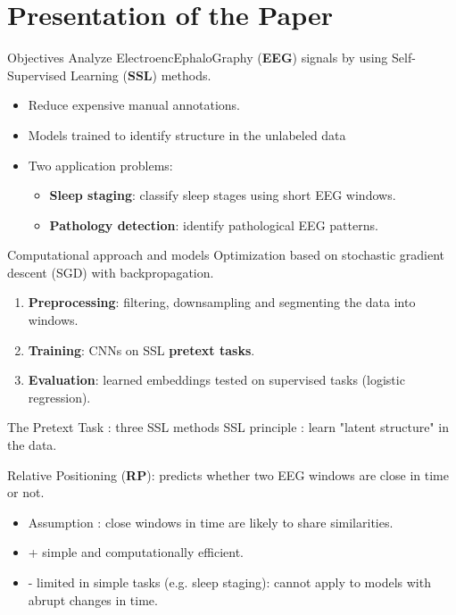 \section{Presentation of the Paper}

\begin{frame}{Objectives}
Analyze ElectroencEphaloGraphy (\textbf{EEG}) signals by using Self-Supervised Learning (\textbf{SSL}) methods.
\begin{itemize}
    \item Reduce expensive manual annotations.
    \item Models trained to identify structure in the unlabeled data
    \item Two application problems:
    \begin{itemize}
        \item \textbf{Sleep staging}: classify sleep stages using short EEG windows.
        \item \textbf{Pathology detection}: identify pathological EEG patterns.
    \end{itemize}
    \end{itemize}
\end{frame}

\begin{frame}{Computational approach and models}
Optimization based on stochastic gradient descent (SGD) with backpropagation.
    \begin{enumerate}
        \item \textbf{Preprocessing}: filtering, downsampling and segmenting the data into windows.
        \item \textbf{Training}: CNNs on SSL \textbf{pretext tasks}.
        \item \textbf{Evaluation}: learned embeddings tested on supervised tasks (logistic regression).
    \end{enumerate}
\end{frame}

\begin{frame}{The Pretext Task : three SSL methods}
SSL principle : learn "latent structure" in the data.

Relative Positioning (\textbf{RP}): predicts whether two EEG windows are close in time or not.
\begin{itemize}
    \item Assumption : close windows in time are likely to share similarities.
    \item + simple and computationally efficient.
    \item - limited in simple tasks (e.g. sleep staging): cannot apply to models with abrupt changes in time.
\end{itemize}
\end{frame}

